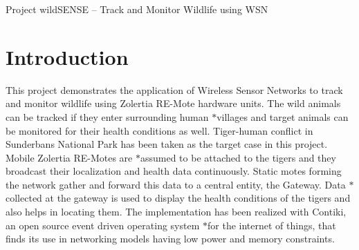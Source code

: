 Project wild\+S\+E\+N\+SE – Track and Monitor Wildlife using W\+SN 

 \hypertarget{index_s0}{}\section{Introduction}\label{index_s0}
This project demonstrates the application of Wireless Sensor Networks to track and monitor wildlife using Zolertia R\+E-\/\+Mote hardware units. The wild animals can be tracked if they enter surrounding human $\ast$villages and target animals can be monitored for their health conditions as well. Tiger-\/human conflict in Sunderbans National Park has been taken as the target case in this project. Mobile Zolertia R\+E-\/\+Motes are $\ast$assumed to be attached to the tigers and they broadcast their localization and health data continuously. Static motes forming the network gather and forward this data to a central entity, the Gateway. Data $\ast$collected at the gateway is used to display the health conditions of the tigers and also helps in locating them. The implementation has been realized with Contiki, an open source event driven operating system $\ast$for the internet of things, that finds its use in networking models having low power and memory constraints.



 